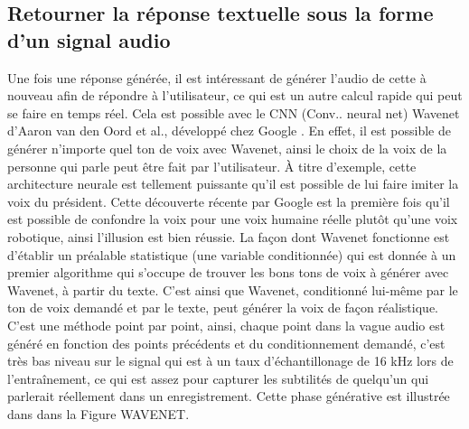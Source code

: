 \subsection{Retourner la réponse textuelle sous la forme d'un signal audio}
Une fois une réponse générée, il est intéressant de générer l’audio de cette à nouveau afin de répondre à l’utilisateur, ce qui est un autre calcul rapide qui peut se faire en temps réel. Cela est possible avec le CNN (Conv.. neural net) Wavenet d’Aaron van den Oord et al., développé chez Google \cite{wavenet}. En effet, il est possible de générer n’importe quel ton de voix avec Wavenet, ainsi le choix de la voix de la personne qui parle peut être fait par l’utilisateur. À titre d’exemple, cette architecture neurale est tellement puissante qu’il est possible de lui faire imiter la voix du président. Cette découverte récente par Google est la première fois qu’il est possible de confondre la voix pour une voix humaine réelle plutôt qu’une voix robotique, ainsi l’illusion est bien réussie. La façon dont Wavenet fonctionne est d’établir un préalable statistique (une variable conditionnée) qui est donnée à un premier algorithme qui s’occupe de trouver les bons tons de voix à générer avec Wavenet, à partir du texte. C’est ainsi que Wavenet, conditionné lui-même par le ton de voix demandé et par le texte, peut générer la voix de façon réalistique. C’est une méthode point par point, ainsi, chaque point dans la vague audio est généré en fonction des points précédents et du conditionnement demandé, c’est très bas niveau sur le signal qui est à un taux d’échantillonage de 16 kHz lors de l’entraînement, ce qui est assez pour capturer les subtilités de quelqu’un qui parlerait réellement dans un enregistrement. Cette phase générative est illustrée dans dans la Figure WAVENET.

